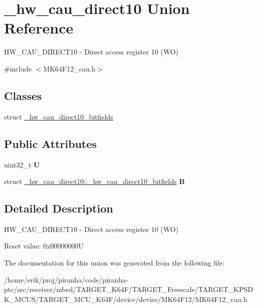 \hypertarget{union__hw__cau__direct10}{}\section{\+\_\+hw\+\_\+cau\+\_\+direct10 Union Reference}
\label{union__hw__cau__direct10}


H\+W\+\_\+\+C\+A\+U\+\_\+\+D\+I\+R\+E\+C\+T10 -\/ Direct access register 10 (WO)  




{\ttfamily \#include $<$M\+K64\+F12\+\_\+cau.\+h$>$}

\subsection*{Classes}
\begin{DoxyCompactItemize}
\item 
struct \hyperlink{struct__hw__cau__direct10_1_1__hw__cau__direct10__bitfields}{\+\_\+hw\+\_\+cau\+\_\+direct10\+\_\+bitfields}
\end{DoxyCompactItemize}
\subsection*{Public Attributes}
\begin{DoxyCompactItemize}
\item 
uint32\+\_\+t {\bfseries U}\hypertarget{union__hw__cau__direct10_add66b18ecbf4c54fe1db4e354f0bd163}{}\label{union__hw__cau__direct10_add66b18ecbf4c54fe1db4e354f0bd163}

\item 
struct \hyperlink{struct__hw__cau__direct10_1_1__hw__cau__direct10__bitfields}{\+\_\+hw\+\_\+cau\+\_\+direct10\+::\+\_\+hw\+\_\+cau\+\_\+direct10\+\_\+bitfields} {\bfseries B}\hypertarget{union__hw__cau__direct10_a3b18482361c73904ec3ab07afcf5a8cc}{}\label{union__hw__cau__direct10_a3b18482361c73904ec3ab07afcf5a8cc}

\end{DoxyCompactItemize}


\subsection{Detailed Description}
H\+W\+\_\+\+C\+A\+U\+\_\+\+D\+I\+R\+E\+C\+T10 -\/ Direct access register 10 (WO) 

Reset value\+: 0x00000000U 

The documentation for this union was generated from the following file\+:\begin{DoxyCompactItemize}
\item 
/home/erik/proj/piranha/code/piranha-\/ptc/src/receiver/mbed/\+T\+A\+R\+G\+E\+T\+\_\+\+K64\+F/\+T\+A\+R\+G\+E\+T\+\_\+\+Freescale/\+T\+A\+R\+G\+E\+T\+\_\+\+K\+P\+S\+D\+K\+\_\+\+M\+C\+U\+S/\+T\+A\+R\+G\+E\+T\+\_\+\+M\+C\+U\+\_\+\+K64\+F/device/device/\+M\+K64\+F12/M\+K64\+F12\+\_\+cau.\+h\end{DoxyCompactItemize}
